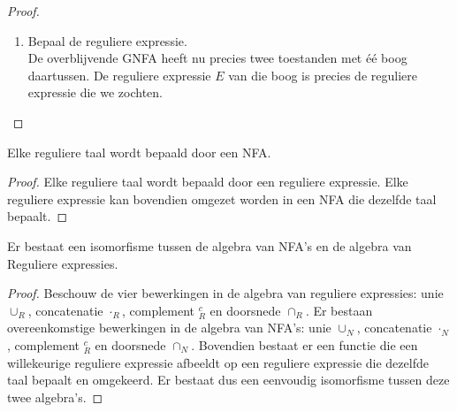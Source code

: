 \documentclass[main.tex]{subfiles}
\begin{document}
\begin{st}
\begin{proof}
\begin{enumerate}
\begin{itemize}
        Als het pad $X$ wel bevat, dan zijn er toestanden $A$ en $B$ zodat $AX^{n}B$ met $n\in \mathbb{N}_{0}$ een opeenvolging is in het pad. De reguliere expressie op de bogen $AX$, $XX$, $XB$ zijn $E_{1}$, $E_{2}$ en $E_{3}$. Bijgevolg kost van $A$ naar $B$ gaan langs $X$ een stukje string dat voldoet aan $E_{1}E_{2}^{*}E_{3}$. Die reguliere expressie staat in $GNFA_{na}$ in de boog $AB$, dus $s$ wordt ook aanvaard door $GNFA_{na}$.
      \item
        Als $s$ aanvaard wordt door $GNFA_{na}$ dan bevat het acceptatiepad alleen maar toestanden verschillend van $X$. Op een boog van $A$ naar $B$ staat de reguliere expressie $E_{4}|E_{1}E_{2}^{*}E_{3}$. Die reguliere expressie gebruiken kost een stukje string dat voldoet aan $E_{4}$ of $E_{1}E_{2}^{*}E_{3}$. In $GNFA_{voor}$ komt dat overeen met ofwel boog $AB$ volgen, ofwel $AX$, gevolgd door $n$ keer $XX$ en $XB$. Dit houdt in dat de string ofwel het pad langs $X$ nodig had, ofwel het pad zonder $X$, langs $A$ en $B$. In beide gevallen aanvaardt $GNFA_{voor}$ ook $s$.
      \end{itemize}
    \item Bepaal de reguliere expressie.\\
      De overblijvende GNFA heeft nu precies twee toestanden met \'e\'e boog daartussen.
      De reguliere expressie $E$ van die boog is precies de reguliere expressie die we zochten.
    \end{enumerate}
  \end{proof}
\end{st}

\begin{gev}
  \label{gev:reguliere-taal-NFA}
  Elke reguliere taal wordt bepaald door een NFA.
  
  \begin{proof}
    Elke reguliere taal wordt bepaald door een reguliere expressie.
    Elke reguliere expressie kan bovendien omgezet worden in een NFA die dezelfde taal bepaalt.
  \end{proof}
\end{gev}

\begin{ei}
  Er bestaat een isomorfisme tussen de algebra van NFA's en de algebra van Reguliere expressies.

  \begin{proof}
    Beschouw de vier bewerkingen in de algebra van reguliere expressies: unie $\cup_{R}$, concatenatie $\cdot_{R}$, complement $^{c}_{R}$ en doorsnede $\cap_{R}$.
    Er bestaan overeenkomstige bewerkingen in de algebra van NFA's: unie $\cup_{N}$, concatenatie $\cdot_{N}$, complement $^{c}_{R}$ en doorsnede $\cap_{N}$.
    Bovendien bestaat er een functie die een willekeurige reguliere expressie afbeeldt op een reguliere expressie die dezelfde taal bepaalt en omgekeerd. 
    Er bestaat dus een eenvoudig isomorfisme tussen deze twee algebra's.
  \end{proof}
\end{ei}
\end{document}
